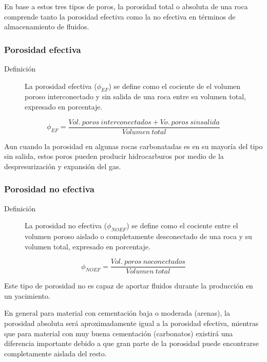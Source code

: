 En base a estos tres tipos de poros, la porosidad total o absoluta de una roca comprende tanto la porosidad efectiva como la no efectiva en términos de almacenamiento de fluidos.

\subsubsection{Porosidad efectiva}

\begin{description}
    \item[Definición] La porosidad efectiva ($\phi_{EF}$) se define como el cociente de el volumen poroso interconectado y sin salida de una roca entre su volumen total, expresado en porcentaje.
\end{description}

\begin{equation*}
\phi_{EF} = \frac{Vol.~ poros~ interconectados + Vo.~poros~sin salida }{Volumen~ total}
\end{equation*}

Aun cuando la porosidad en algunas rocas carbonatadas es en su mayoría del tipo sin salida, estos poros pueden producir hidrocarburos por medio de la despresurización y expansión del gas.

\subsubsection{Porosidad no efectiva}

\begin{description}
    \item[Definición] La porosidad no efectiva ($\phi_{NOEF}$) se define como el cociente entre el volumen poroso aislado o completamente desconectado de una roca y su volumen total, expresado en porcentaje.
\end{description}

\begin{equation*}
\phi_{NOEF} = \frac{Vol.~ poros~ no conectados }{Volumen~ total}
\end{equation*}

Este tipo de porosidad no es capaz de aportar fluidos durante la producción en un yacimiento.

En general para material con cementación baja o moderada (arenas), la porosidad absoluta será aproximadamente igual a la porosidad efectiva, mientras que para material con muy buena cementación (carbonatos) existirá una diferencia importante debido a que gran parte de la porosidad puede encontrarse completamente aislada del resto.

